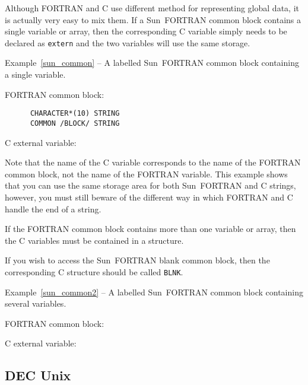\documentclass[twoside,11pt]{article}
\newcommand{\latex}[1]{#1}
\newcommand{\xlabel}[1]{}
\renewcommand{\_}{\texttt{\symbol{95}}}
\newcounter{examples}
\begin{document}
Although FORTRAN and C use different method for representing global data, it is
actually very easy to mix them. If a Sun~FORTRAN common block contains a single
variable or array, then the corresponding C variable simply needs to be
declared as \texttt{extern} and the two variables will use the same storage.

\label{sun_common}
\begin{center}
Example\latex{~\ref{sun_common}}
-- A labelled Sun~FORTRAN common block containing a
single variable.
\end{center}
\nopagebreak[4]
FORTRAN common block:
{\small \begin{verbatim}
      CHARACTER*(10) STRING
      COMMON /BLOCK/ STRING
\end{verbatim} }

C external variable:

Note that the name of the C variable corresponds to the name of the FORTRAN
common block, not the name of the FORTRAN variable. This example shows that you
can use the same storage area for both Sun~FORTRAN and C strings, however, you
must still beware of the different way in which FORTRAN and C handle the end of
a string.

If the FORTRAN common block contains more than one variable or array, then the 
C variables must be contained in a structure.

If you wish to access the Sun~FORTRAN blank common block, then the 
corresponding C structure should be called \texttt{\_BLNK\_\_}.

\label{sun_common2}
\begin{center}
Example\latex{~\ref{sun_common2}}
-- A labelled Sun~FORTRAN common block containing several variables.
\end{center}
\nopagebreak[4]
FORTRAN common block:

C external variable:

\subsection{\xlabel{dec_unix}DEC Unix}
\end{document}
